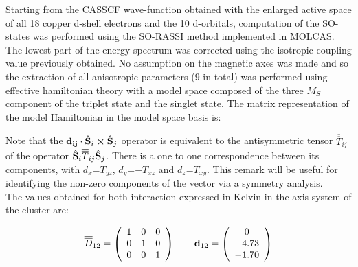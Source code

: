\documentclass[12pt]{report}
\numberwithin{equation}{section}
\begin{document}
Starting from the CASSCF wave-function obtained with the enlarged active space of all 18 copper d-shell electrons and the 10 d-orbitals, computation of the SO-states was performed using the SO-RASSI method implemented in MOLCAS.
The lowest part of the energy spectrum was corrected using the isotropic coupling value previously obtained.
No assumption on the magnetic axes was made and so the extraction of all anisotropic parameters (9 in total) was performed using effective hamiltonian theory with a model space composed of the three $M_S$ component of the triplet state and the singlet state.
The matrix representation of the model Hamiltonian in the model space basis is:
\begin{center}
    \centering
\end{center}
Note that the $\vb{d_{ij}} \cdot \hat{\vb{S}}_i \cross \hat{\vb{S}}_j$ operator is equivalent to the antisymmetric tensor $\overline{\overline{T}}_{ij}$ of the operator $\hat{\vb{S}}_i \overline{\overline{T}}_{ij} \hat{\vb{S}}_j$.
There is a one to one correspondence between its components, with $d_x$=$T_{yz}$, $d_y$=$-T_{xz}$ and $d_z$=$T_{xy}$.
This remark will be useful for identifying the non-zero components of the vector via a symmetry analysis.\\
The values obtained for both interaction expressed in Kelvin in the axis system of the cluster are:

\[ \overline{\overline{D}}_{12}= \left( \begin{array}{c c c}
    1 & 0 & 0\\
    0 & 1 & 0\\
    0 & 0 & 1
    \end{array} \right)
    \qquad
    \vb{d}_{12}=
    \left( \begin{array}{c}
    0  \\
    -4.73  \\
    -1.70
    \end{array} \right)
    \]
    
\end{document}
